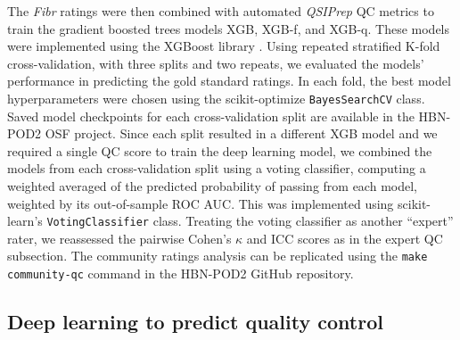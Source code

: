 \documentclass[fleqn,10pt]{wlscirep}
\begin{document}
The \emph{Fibr} ratings were then combined with automated \emph{QSIPrep} QC
metrics to train the gradient boosted trees models XGB, XGB-f, and XGB-q. These
models were implemented using the XGBoost library \cite{xgboost}. Using repeated
stratified K-fold cross-validation, with three splits and two repeats, we
evaluated the models' performance in predicting the gold standard ratings. In
each fold, the best model hyperparameters were chosen using the scikit-optimize
\cite{scikit-optimize} \texttt{BayesSearchCV} class. Saved model checkpoints for
each cross-validation split are available in the HBN-POD2 OSF project. Since
each split resulted in a different XGB model and we required a single QC score
to train the deep learning model, we combined the models from each
cross-validation split using a voting classifier, computing a weighted averaged
of the predicted probability of passing from each model, weighted by its
out-of-sample ROC AUC. This was implemented using scikit-learn's
\texttt{VotingClassifier} class. Treating the voting classifier as another
``expert'' rater, we reassessed the pairwise Cohen's $\kappa$ and ICC scores as
in the expert QC subsection. The community ratings analysis can be replicated
using the \texttt{make community-qc} command in the HBN-POD2 GitHub repository.

\subsection*{Deep learning to predict quality control}
\end{document}
